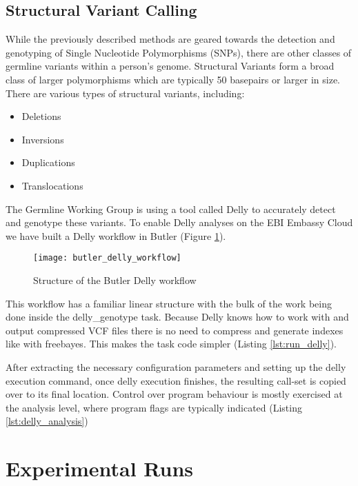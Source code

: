 \subsection {Structural Variant Calling}

While the previously described methods are geared towards the detection and genotyping of Single Nucleotide Polymorphisms (SNPs), there are other classes of germline variants within a person's genome. Structural Variants form a broad class of larger polymorphisms which are typically 50 basepairs or larger in size\autocite{sudmant2015integrated}. There are various types of structural variants, including:

\begin{itemize}
\item Deletions
\item Inversions
\item Duplications
\item Translocations
\end{itemize}

The Germline Working Group is using a tool called Delly\autocite{rausch2012delly} to accurately detect and genotype these variants. To enable Delly analyses on the EBI Embassy Cloud we have built a Delly workflow in Butler (Figure \ref{fig:butler_delly_workflow}).

\begin{figure}[H]
\texttt{[image: butler\_delly\_workflow]}
\centering
\caption {Structure of the Butler Delly workflow}
\label{fig:butler_delly_workflow}
\end{figure}

This workflow has a familiar linear structure with the bulk of the work being done inside the delly\_genotype task. Because Delly knows how to work with and output compressed VCF files there is no need to compress and generate indexes like with freebayes. This makes the task code simpler (Listing \ref{lst:run_delly}).


After extracting the necessary configuration parameters and setting up the delly execution command, once delly execution finishes, the resulting call-set is copied over to its final location. Control over program behaviour is mostly exercised at the analysis level, where program flags are typically indicated (Listing \ref{lst:delly_analysis})

\section{Experimental Runs}

